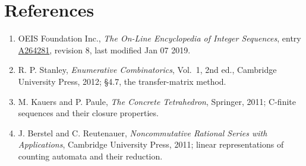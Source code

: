 \documentclass[11pt]{article}
\theoremstyle{definition}
\begin{document}
\section{References}

\begin{enumerate}

\item OEIS Foundation Inc., \emph{The On-Line Encyclopedia of Integer Sequences}, entry \href{https://oeis.org/A264281}{A264281}, revision 8, last modified Jan 07 2019.

\item R. P. Stanley, \emph{Enumerative Combinatorics}, Vol.~1, 2nd ed., Cambridge University Press, 2012; \S4.7, the transfer-matrix method.

\item M. Kauers and P. Paule, \emph{The Concrete Tetrahedron}, Springer, 2011; C-finite sequences and their closure properties.

\item J. Berstel and C. Reutenauer, \emph{Noncommutative Rational Series with Applications}, Cambridge University Press, 2011; linear representations of counting automata and their reduction.

\end{enumerate}
\end{document}
